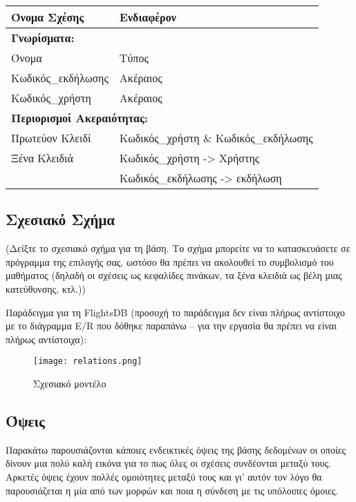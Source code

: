 \begin{tabular}{|p{6cm}|p{8cm}|}
  \hline
  Όνομα Σχέσης      & Ενδιαφέρον                           \\ \hline
  \multicolumn{2}{|l|}{\textbf{Γνωρίσματα:}}               \\ \hline
  Όνομα             & Τύπος                                \\ \hline
  Κωδικός\_εκδήλωσης & Ακέραιος                             \\ \hline
  Κωδικός\_χρήστη    & Ακέραιος                             \\ \hline
  \multicolumn{2}{|l|}{\textbf{Περιορισμοί Ακεραιότητας:}} \\ \hline
  Πρωτεύον Κλειδί   & Κωδικός\_χρήστη \& Κωδικός\_εκδήλωσης  \\ \hline
  Ξένα Κλειδιά      & Κωδικός\_χρήστη -> Χρήστης            \\ \hline
                    & Κωδικός\_εκδήλωσης -> εκδήλωση        \\ \hline
\end{tabular}



\subsection{Σχεσιακό Σχήμα}

(Δείξτε το σχεσιακό σχήμα για τη βάση. Το σχήμα μπορείτε να το
κατασκευάσετε σε πρόγραμμα της επιλογής σας, ωστόσο θα πρέπει να
ακολουθεί το συμβολισμό του μαθήματος (δηλαδή οι σχέσεις ως κεφαλίδες
πινάκων, τα ξένα κλειδιά ως βέλη μιας κατεύθυνσης, κτλ.))

Παράδειγμα για τη FlightsDB (προσοχή το παράδειγμα δεν είναι πλήρως
αντίστοιχο με το διάγραμμα E/R που δόθηκε παραπάνω – για την εργασία
θα πρέπει να είναι πλήρως αντίστοιχα):

\begin{figure}[H]
  \centering
  \texttt{[image: relations.png]}
  \caption{Σχεσιακό μοντέλο}
\end{figure}

\subsection{Όψεις}

Παρακάτω παρουσιάζονται κάποιες ενδεικτικές όψεις της βάσης δεδομένων
οι οποίες δίνουν μια πολύ καλή εικόνα για το πως όλες οι σχέσεις
συνδέονται μεταξύ τους. Αρκετές όψεις έχουν πολλές ομοιότητες μεταξύ
τους και γι' αυτόν τον λόγο θα παρουσιάζεται η μία από των μορφών και
ποια η σύνδεση με τις υπόλοιπες όμοιες.

